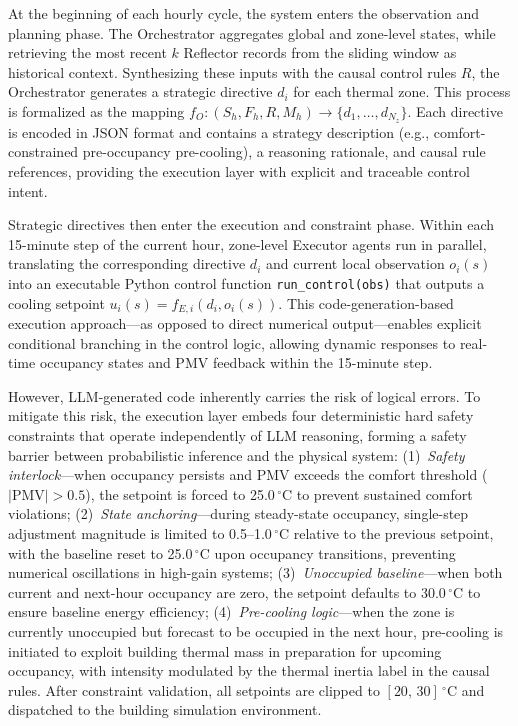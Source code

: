 \documentclass[a4paper]{cas-sc}
\begin{document}
At the beginning of each hourly cycle, the system enters the observation and planning phase. The Orchestrator aggregates global and zone-level states, while retrieving the most recent $k$ Reflector records from the sliding window as historical context. Synthesizing these inputs with the causal control rules $R$, the Orchestrator generates a strategic directive $d_i$ for each thermal zone. This process is formalized as the mapping $f_O: (S_h, F_h, R, M_h) \rightarrow \{d_1, \ldots, d_{N_z}\}$. Each directive is encoded in JSON format and contains a strategy description (e.g., comfort-constrained pre-occupancy pre-cooling), a reasoning rationale, and causal rule references, providing the execution layer with explicit and traceable control intent.

Strategic directives then enter the execution and constraint phase. Within each 15-minute step of the current hour, zone-level Executor agents run in parallel, translating the corresponding directive $d_i$ and current local observation $o_i(s)$ into an executable Python control function \texttt{run\_control(obs)} that outputs a cooling setpoint $u_i(s) = f_{E,i}(d_i, o_i(s))$. This code-generation-based execution approach---as opposed to direct numerical output---enables explicit conditional branching in the control logic, allowing dynamic responses to real-time occupancy states and PMV feedback within the 15-minute step.

However, LLM-generated code inherently carries the risk of logical errors. To mitigate this risk, the execution layer embeds four deterministic hard safety constraints that operate independently of LLM reasoning, forming a safety barrier between probabilistic inference and the physical system: (1)~\textit{Safety interlock}---when occupancy persists and PMV exceeds the comfort threshold ($|\text{PMV}| > 0.5$), the setpoint is forced to 25.0\,$^{\circ}$C to prevent sustained comfort violations; (2)~\textit{State anchoring}---during steady-state occupancy, single-step adjustment magnitude is limited to 0.5--1.0\,$^{\circ}$C relative to the previous setpoint, with the baseline reset to 25.0\,$^{\circ}$C upon occupancy transitions, preventing numerical oscillations in high-gain systems; (3)~\textit{Unoccupied baseline}---when both current and next-hour occupancy are zero, the setpoint defaults to 30.0\,$^{\circ}$C to ensure baseline energy efficiency; (4)~\textit{Pre-cooling logic}---when the zone is currently unoccupied but forecast to be occupied in the next hour, pre-cooling is initiated to exploit building thermal mass in preparation for upcoming occupancy, with intensity modulated by the thermal inertia label in the causal rules. After constraint validation, all setpoints are clipped to $[20,\,30]\,^{\circ}$C and dispatched to the building simulation environment.
\end{document}
